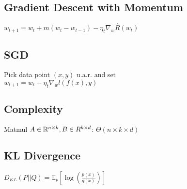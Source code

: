 \subsection*{Gradient Descent with Momentum} $w_{t+1}=w_t+m(w_t-w_{t-1})-\eta_t \nabla_w \hat{R}(w_t)$
\subsection*{SGD}
Pick data point $(x,y)$ u.a.r. and	set\\  $w_{t+1} = w_t - \eta_t \nabla_w l(f(x),y)$
\subsection*{Complexity}
Matmul $A\in\mathbb{R}^{n\times k},B\in R^{k\times d}$: $\Theta(n\times k\times d)$

\subsection*{KL Divergence}
$D_{KL}(P||Q) = \mathbb{E}_p[\log(\frac{p(x)}{q(x)})]$
\\